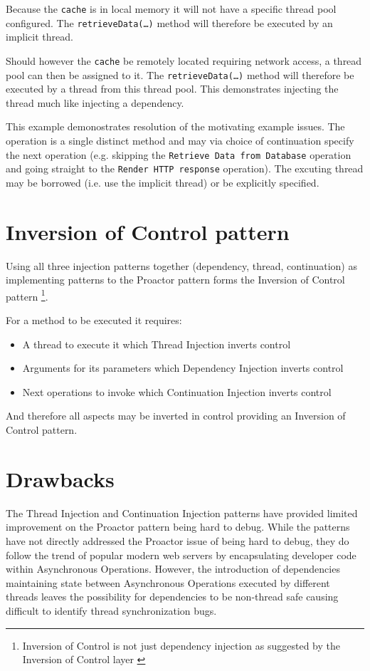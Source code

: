 \documentclass{article}
\begin{document}
Because the \texttt{cache} is in local memory it will not have a specific thread
pool configured.  The \texttt{retrieveData(\ldots)} method will therefore be
executed by an implicit thread.

Should however the \texttt{cache} be remotely located requiring network access,
a thread pool can then be assigned to it.  The \texttt{retrieveData(\ldots)}
method will therefore be executed by a thread from this thread pool.  This
demonstrates injecting the thread much like injecting a dependency.

This example demonostrates resolution of the motivating example issues.  The
operation is a single distinct method and may via choice of continuation specify
the next operation (e.g. skipping the \texttt{Retrieve Data from Database}
operation and going straight to the \texttt{Render HTTP response} operation).
The excuting thread may be borrowed (i.e. use the implicit thread) or be
explicitly specified.


\section{Inversion of Control pattern}

Using all three injection patterns together (dependency, thread, continuation)
as implementing patterns to the Proactor pattern forms the Inversion of Control
pattern \footnote{Inversion of Control is not just dependency injection as
suggested by the Inversion of Control layer \cite{ioc}}.

For a method to be executed it requires:
\begin{itemize}
  \item A thread to execute it which Thread Injection inverts control
  \item Arguments for its parameters which Dependency Injection inverts control
  \item Next operations to invoke which Continuation Injection inverts control
\end{itemize}

And therefore all aspects may be inverted in control providing an Inversion of
Control pattern.


\section{Drawbacks}

The Thread Injection and Continuation Injection patterns have provided limited
improvement on the Proactor pattern being hard to debug.  While the patterns
have not directly addressed the Proactor issue of being hard to debug, they do
follow the trend of popular modern web servers by encapsulating developer code
within Asynchronous Operations.  However, the introduction of dependencies
maintaining state between Asynchronous Operations executed by different threads
leaves the possibility for dependencies to be non-thread safe causing difficult
to identify thread synchronization bugs.
\end{document}
